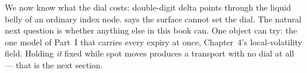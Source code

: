 We now know what the dial costs: double-digit delta points through the
liquid belly of an ordinary index node.   says the
surface cannot set the dial.  The natural next question is whether
anything else in this book can.  One object can try: the one model of
Part~I that carries every expiry at once, Chapter~4's local-volatility
field.  Holding \emph{it} fixed while spot moves produces a transport
with no dial at all --- that is the next section.
